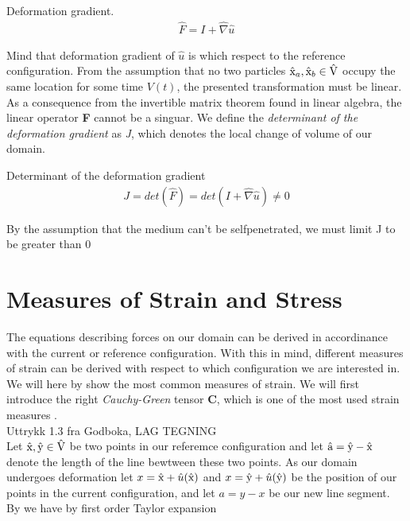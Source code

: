 \begin{defn}
Deformation gradient. 
\begin{align}
\hat{F} = I + \hat{\nabla} \hat{u} 
\end{align} 
\end{defn}

Mind that deformation gradient of $\hat{u}$ is which respect to the reference configuration. 
From the assumption that no two particles $\text{\^{x}}_a, \text{\^{x}}_b \in \text{\^{V}}$ occupy the same location for some time $V(t)$, the presented transformation must be linear. As a consequence from the invertible matrix theorem found in linear algebra, the linear operator \textbf{F} cannot be a singuar.  
We define the  \textit{determinant of the deformation gradient} as \textit{J}, which denotes the local change of volume of our domain. 

\begin{defn}
Determinant of the deformation gradient
\begin{align}
J = det(\hat{F}) = det( I + \hat{\nabla} \hat{u} ) \neq 0
\end{align} 
\end{defn}


By the assumption that the medium can't be selfpenetrated, we must limit  J to be greater than 0 \cite{Wriggers2006}

\section{Measures of Strain and Stress}
The equations describing forces on our domain can be derived in accordinance with the current or reference configuration. With this in mind, different measures of strain can be derived with respect to which configuration we are interested in. We will here by \cite{Richter2016} show the most common measures of strain. We will first introduce the right \textit{Cauchy-Green} tensor \textbf{C}, which is one of the most used strain measures \cite{Wriggers2006}. \\ Uttrykk 1.3 fra Godboka, LAG TEGNING \\ 

Let $\text{\^{x}}, \text{\^{y}} \in \text{\^{V}}$ be two points in our referemce configuration and let $\text{\^{a}} = \text{\^{y}} - \text{\^{x}}$ denote the
length of the line bewtween these two points. As our domain undergoes deformation let 
$x = \text{\^{x}} + \hat{u}( \text{\^{x}} ) $ and $x = \text{\^{y}} + \hat{u}( \text{\^{y}} )  $ be the position of our points in the current configuration, and let $a = y - x$ be our new line segment. By \cite{Richter2016} we have by first order Taylor expansion


